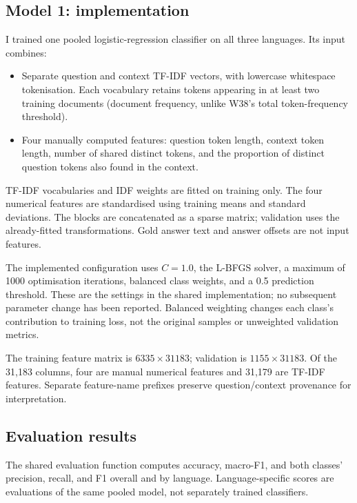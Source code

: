 \documentclass[11pt,a4paper]{article}
\begin{document}
\subsection{Model 1: implementation}
I trained one pooled logistic-regression classifier on all three languages. Its input combines:
\begin{itemize}
\item Separate question and context TF-IDF vectors, with lowercase whitespace tokenisation. Each vocabulary retains tokens appearing in at least two training documents (document frequency, unlike W38's total token-frequency threshold).
\item Four manually computed features: question token length, context token length, number of shared distinct tokens, and the proportion of distinct question tokens also found in the context.
\end{itemize}
TF-IDF vocabularies and IDF weights are fitted on training only. The four numerical features are standardised using training means and standard deviations. The blocks are concatenated as a sparse matrix; validation uses the already-fitted transformations. Gold answer text and answer offsets are not input features.

The implemented configuration uses $C=1.0$, the L-BFGS solver, a maximum of 1000 optimisation iterations, balanced class weights, and a 0.5 prediction threshold. These are the settings in the shared implementation; no subsequent parameter change has been reported. Balanced weighting changes each class's contribution to training loss, not the original samples or unweighted validation metrics.

The training feature matrix is $6335\times31183$; validation is $1155\times31183$. Of the 31,183 columns, four are manual numerical features and 31,179 are TF-IDF features. Separate feature-name prefixes preserve question/context provenance for interpretation.

\subsection{Evaluation results}
The shared evaluation function computes accuracy, macro-F1, and both classes' precision, recall, and F1 overall and by language. Language-specific scores are evaluations of the same pooled model, not separately trained classifiers.
\end{document}
